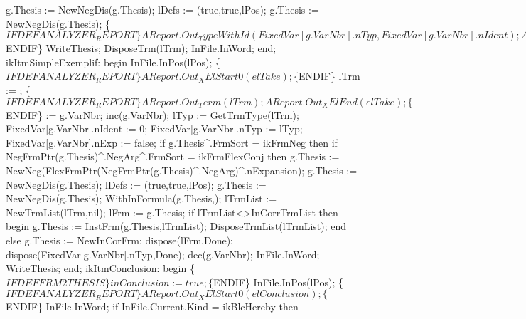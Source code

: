                g.Thesis := NewNegDis(g.Thesis);
               lDefs := (true,true,lPos);
               g.Thesis := NewNegDis(g.Thesis);
               \{$IFDEF ANALYZER_REPORT\}
               AReport.Out_TypeWithId(FixedVar[g.VarNbr].nTyp,
                                      FixedVar[g.VarNbr].nIdent);
               AReport.Out_Term(lTrm);
               AReport.Out_XElEnd(elTakeAsVar);
               \{$ENDIF\}
               WriteThesis;
               DisposeTrm(lTrm); InFile.InWord;
            end;
         ikItmSimpleExemplif:
            begin
               InFile.InPos(lPos);
               \{$IFDEF ANALYZER_REPORT\}
               AReport.Out_XElStart0(elTake);
               \{$ENDIF\}
               lTrm := ;
               \{$IFDEF ANALYZER_REPORT\}
               AReport.Out_Term(lTrm);
               AReport.Out_XElEnd(elTake);
               \{$ENDIF\}
                := g.VarNbr; inc(g.VarNbr);
               lTyp := GetTrmType(lTrm);
               FixedVar[g.VarNbr].nIdent := 0;
               FixedVar[g.VarNbr].nTyp := lTyp;
               FixedVar[g.VarNbr].nExp := false;
               if g.Thesis^.FrmSort = ikFrmNeg then
                  if NegFrmPtr(g.Thesis)^.NegArg^.FrmSort = ikFrmFlexConj then
                     g.Thesis := NewNeg(FlexFrmPtr(NegFrmPtr(g.Thesis)^.NegArg)^.nExpansion);
               g.Thesis := NewNegDis(g.Thesis);
               lDefs := (true,true,lPos);
               g.Thesis := NewNegDis(g.Thesis);
               WithInFormula(g.Thesis,);
               lTrmList := NewTrmList(lTrm,nil);
               lFrm := g.Thesis;
               if lTrmList<>InCorrTrmList then
               begin
                  g.Thesis := InstFrm(g.Thesis,lTrmList);
                  DisposeTrmList(lTrmList);
               end
               else g.Thesis := NewInCorFrm;
               dispose(lFrm,Done);
               dispose(FixedVar[g.VarNbr].nTyp,Done);
               dec(g.VarNbr);
               InFile.InWord;
               WriteThesis;
            end;
         ikItmConclusion:
            begin
               \{$IFDEF FRM2THESIS\}
                   inConclusion := true;
               \{$ENDIF\}
                   InFile.InPos(lPos);
               \{$IFDEF ANALYZER_REPORT\}
               AReport.Out_XElStart0(elConclusion);
               \{$ENDIF\}
               InFile.InWord;
               if InFile.Current.Kind = ikBlcHereby then
